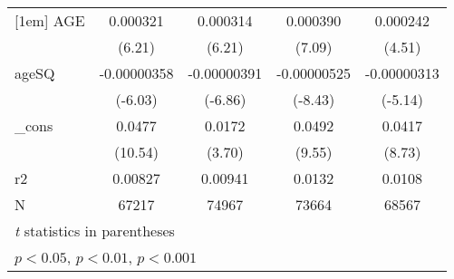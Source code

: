 \begin{table}[htbp]
\begin{tabular}{l*{4}{c}}
[1em]
AGE         &    0.000321\sym{***}&    0.000314\sym{***}&    0.000390\sym{***}&    0.000242\sym{***}\\
            &      (6.21)         &      (6.21)         &      (7.09)         &      (4.51)         \\
[1em]
ageSQ       & -0.00000358\sym{***}& -0.00000391\sym{***}& -0.00000525\sym{***}& -0.00000313\sym{***}\\
            &     (-6.03)         &     (-6.86)         &     (-8.43)         &     (-5.14)         \\
[1em]
\_cons      &      0.0477\sym{***}&      0.0172\sym{***}&      0.0492\sym{***}&      0.0417\sym{***}\\
            &     (10.54)         &      (3.70)         &      (9.55)         &      (8.73)         \\
\hline
r2          &     0.00827         &     0.00941         &      0.0132         &      0.0108         \\
N           &       67217         &       74967         &       73664         &       68567         \\
\hline\hline
\multicolumn{5}{l}{\footnotesize \textit{t} statistics in parentheses}\\
\multicolumn{5}{l}{\footnotesize \sym{*} \(p<0.05\), \sym{**} \(p<0.01\), \sym{***} \(p<0.001\)}\\
\end{tabular}
\end{table}
